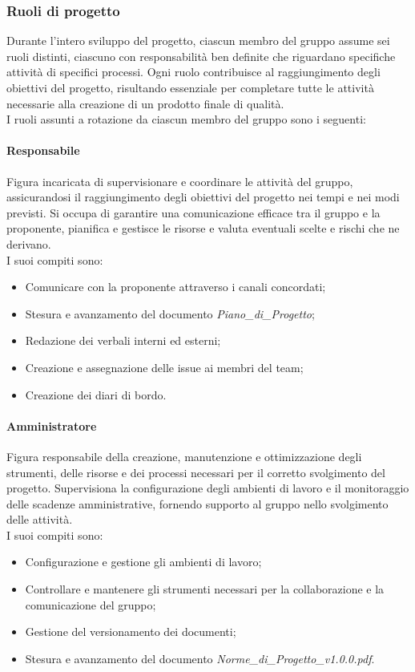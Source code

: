 \documentclass[10pt]{article}
\begin{document}
\begin{justify}
    \subsubsection{Ruoli di progetto}
    Durante l'intero sviluppo del progetto, ciascun membro del gruppo assume sei ruoli distinti, ciascuno con responsabilità ben definite che riguardano specifiche attività di specifici processi.
    Ogni ruolo contribuisce al raggiungimento degli obiettivi del progetto, risultando essenziale per completare tutte le attività necessarie alla creazione di un prodotto finale di qualità.\\
    I ruoli assunti a rotazione da ciascun membro del gruppo sono i seguenti:

        \paragraph{Responsabile}
        Figura incaricata di supervisionare e coordinare le attività del gruppo, assicurandosi il raggiungimento degli obiettivi del progetto nei tempi e nei modi previsti. Si occupa di garantire una comunicazione efficace tra il gruppo e la proponente, pianifica e gestisce le risorse e valuta eventuali scelte e rischi che ne derivano.\\
        I suoi compiti sono:
        \begin{itemize}
            \item Comunicare con la proponente attraverso i canali concordati;
            \item Stesura e avanzamento del documento \textit{Piano\_di\_Progetto};
            \item Redazione dei verbali interni ed esterni;
            \item Creazione e assegnazione delle issue ai membri del team;
            \item Creazione dei diari di bordo.
        \end{itemize}

        \paragraph{Amministratore}
        Figura responsabile della creazione, manutenzione e ottimizzazione degli strumenti, delle risorse e dei processi necessari per il corretto svolgimento del progetto. Supervisiona la configurazione degli ambienti di lavoro e il monitoraggio delle scadenze amministrative, fornendo supporto al gruppo nello svolgimento delle attività.\\
        I suoi compiti sono:
        \begin{itemize}
            \item Configurazione e gestione gli ambienti di lavoro;
            \item Controllare e mantenere gli strumenti necessari per la collaborazione e la comunicazione del gruppo;
            \item Gestione del versionamento dei documenti;
            \item Stesura e avanzamento del documento \textit{Norme\_di\_Progetto\_v1.0.0.pdf}.
        \end{itemize}


\end{justify}
\end{document}
